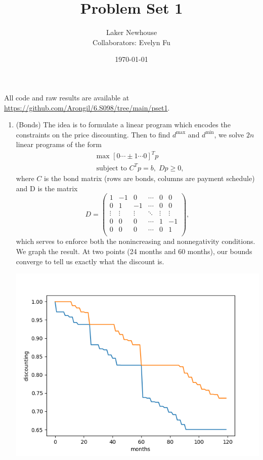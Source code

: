 \documentclass{article}
\title{Problem Set 1}
\author{Laker Newhouse\\Collaborators: Evelyn Fu}
\date{\today}
\begin{document}
\maketitle	

All code and raw results are available at \url{https://github.com/Arongil/6.S098/tree/main/pset1}.
\begin{enumerate}
    \item (Bonds) The idea is to formulate a linear program which encodes the constraints on the price discounting. Then to find $d^\text{max}$ and $d^\text{min}$, we solve $2n$ linear programs of the form \begin{align*}
        & \text{max } [0 \cdots \pm 1 \cdots 0]^T p \\
        & \text{subject to } C^T p = b, \; Dp \geq 0,
    \end{align*} where $C$ is the bond matrix (rows are bonds, columns are payment schedule) and D is the matrix \[
        D = \begin{pmatrix}
            1 & -1 & 0 & \cdots & 0 & 0 \\
            0 & 1 & -1 & \cdots & 0 & 0 \\
            \vdots & \vdots & \vdots & \ddots & \vdots & \vdots \\
            0 & 0 & 0 & \cdots & 1 & -1 \\
            0 & 0 & 0 & \cdots & 0 & 1 \\
        \end{pmatrix},
    \] which serves to enforce both the nonincreasing and nonnegativity conditions. We graph the result. At two points (24 months and 60 months), our bounds converge to tell us exactly what the discount is.
    
    \begin{center}
    	\includegraphics[scale=0.5]{p1_plot}
    \end{center}
    

\end{enumerate}
\end{document}
